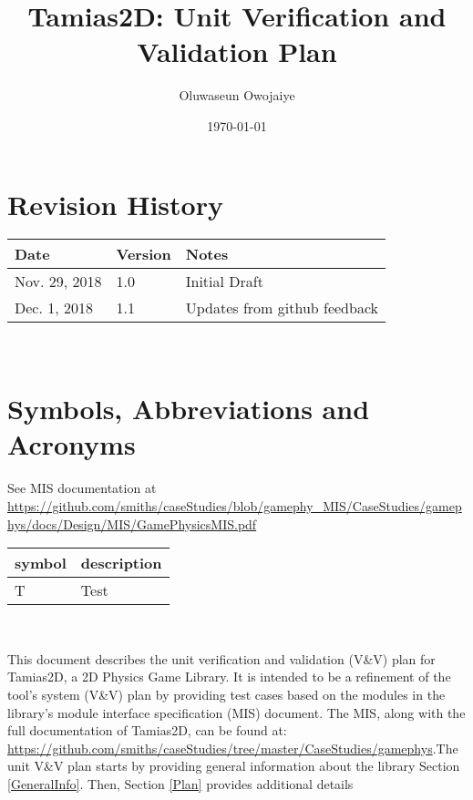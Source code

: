 \documentclass[12pt, titlepage]{article}
\newcommand{\progname}{Tamias2D}
\begin{document}
\title{Tamias2D: Unit Verification and Validation Plan} 
\author{Oluwaseun Owojaiye}
\date{\today}
	
\maketitle


\section{Revision History}

\begin{tabularx}{\textwidth}{p{3cm}p{2cm}X}
\toprule {\bf Date} & {\bf Version} & {\bf Notes}\\
\midrule
Nov. 29, 2018 & 1.0 & Initial Draft\\
Dec. 1, 2018 & 1.1 & Updates from github feedback\\
\bottomrule
\end{tabularx}

~\newpage

\section{Symbols, Abbreviations and Acronyms}
See MIS documentation at \url{https://github.com/smiths/caseStudies/blob/gamephy_MIS/CaseStudies/gamephys/docs/Design/MIS/GamePhysicsMIS.pdf} \\
\renewcommand{\arraystretch}{1.2}
\begin{tabular}{l l} 
  \toprule		
  \textbf{symbol} & \textbf{description}\\
  \midrule 
  T & Test\\
  \bottomrule
\end{tabular}\\


\newpage

\tableofcontents

\listoftables

\listoffigures

\newpage


This document describes the unit verification and validation (V\&V) plan for \progname, a 2D Physics Game Library. It is intended to be a refinement of the tool's system (V\&V) plan by providing test cases based on the modules in the library's module interface specification (MIS) document. The MIS, along with the full documentation of \progname{}, can be found at: \url{https://github.com/smiths/caseStudies/tree/master/CaseStudies/gamephys}.The unit V\&V plan starts by providing general information about the library Section \ref{GeneralInfo}. Then, Section \ref{Plan} provides additional details 
\end{document}
